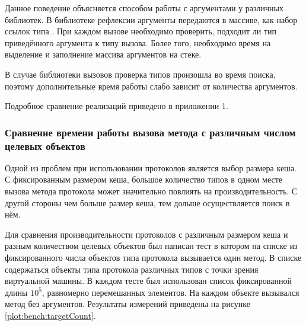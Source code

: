 Данное поведение объясняется способом работы с аргументами у различных библиотек. В библиотеке рефлексии аргументы передаются в массиве, как набор ссылок типа . При каждом вызове необходимо проверить, подходит ли тип приведённого аргумента к типу вызова. Более того, необходимо время на выделение и заполнение массива аргументов на стеке.

В случае библиотеки вызовов проверка типов произошла во время поиска, поэтому дополнительные время работы слабо зависит от количества аргументов.

Подробное сравнение реализаций приведено в приложении 1.

\subsubsection{Сравнение времени работы вызова метода с различным числом целевых объектов}
Одной из проблем при использовании протоколов является выбор размера кеша. С фиксированным размером кеша, большое количество типов в одном месте вызова метода протокола может значительно повлиять на  производительность. С другой стороны чем больше размер кеша, тем дольше осуществляется поиск в нём.

Для сравнения производительности протоколов с различным размером кеша и разным количеством целевых объектов был написан тест в котором на списке из фиксированного числа объектов типа протокола вызывается один метод. В списке содержаться объекты типа протокола различных типов с точки зрения виртуальной машины. В каждом тесте был использован список фиксированной длины $10^5$, равномерно перемешанных элементов. На каждом объекте вызывался метод без аргументов. Результаты измерений приведены на рисунке \ref{plot:bench:targetCount}.

